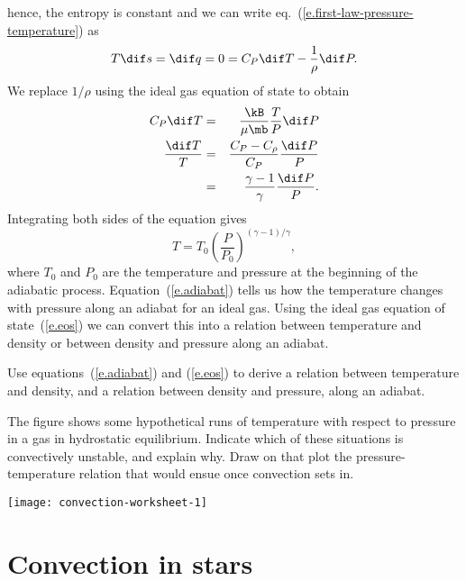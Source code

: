  hence, the entropy is constant and we can write eq.~(\ref{e.first-law-pressure-temperature}) as
\begin{equation}\label{e.differential-entropy}
    T\dif s = \dif q = 0 = C_{P}\dif T - \frac{1}{\rho} \dif P.
\end{equation}
We replace $1/\rho$ using the ideal gas equation of state
to obtain
\begin{eqnarray}
     C_{P}\dif T &=& \frac{\kB}{\mu\mb}\frac{T}{P}\dif P \nonumber\\
     \frac{\dif T}{T} &=& \frac{C_{P}-C_{\rho}}{C_{P}} \frac{\dif P}{P}\nonumber\\
	&=& \frac{\gamma-1}{\gamma}\frac{\dif P}{P}.
\label{e.differential-adiabat}
\end{eqnarray}
Integrating both sides of the equation gives
\begin{equation}\label{e.adiabat}
 T = T_{0}\left(\frac{P}{P_{0}}\right)^{(\gamma-1)/\gamma},
\end{equation}
where $T_{0}$ and $P_{0}$ are the temperature and pressure at the beginning of the adiabatic process. Equation~(\ref{e.adiabat}) tells us how the temperature changes with pressure along an adiabat for an ideal gas. Using the ideal gas equation of state~(\ref{e.eos}) we can convert this into a relation between temperature and density or between density and pressure along an adiabat.

\begin{exercisebox}
Use equations~(\ref{e.adiabat}) and (\ref{e.eos}) to derive a relation between temperature and density, and a relation between density and pressure, along an adiabat.
\end{exercisebox}

\begin{exercisebox}
The figure shows some hypothetical runs of temperature with respect to pressure in a gas in hydrostatic equilibrium.  Indicate which of these situations is convectively unstable, and explain why. Draw on that plot the pressure-temperature relation that would ensue once convection sets in.

\texttt{[image: convection-worksheet-1]}
\end{exercisebox}

\section{Convection in stars}
\label{s.convection-in-stars}

